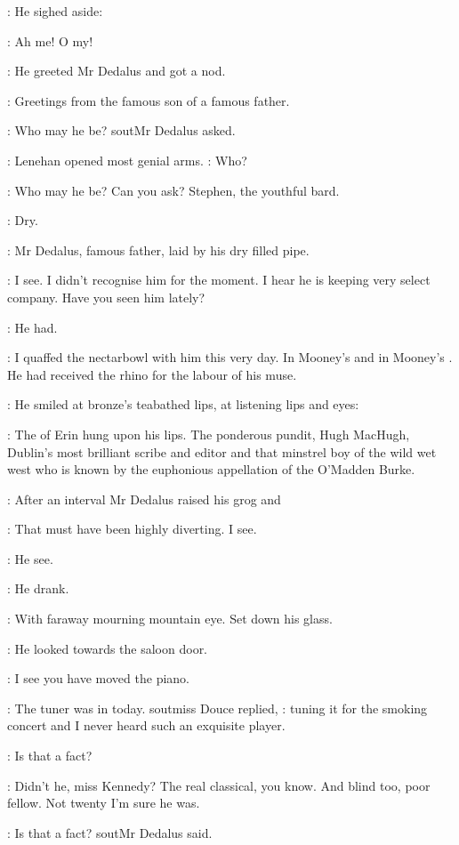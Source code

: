 :
He sighed aside:

\Lenehan:
Ah me! O my!

:
He greeted Mr Dedalus and got a nod.

\Lenehan:
Greetings from the famous son of a famous father.

\Simon:
Who may he be?
sout{Mr Dedalus asked.}

:
Lenehan opened most genial arms.
\Lenehan:
Who?

\Lenehan:
Who may he be? Can you ask? Stephen, the youthful bard.

:
Dry.

:
Mr Dedalus, famous father, laid by his dry filled pipe.

\Simon:
I see.
I didn't recognise him for the moment. I hear he is
keeping very select company. Have you seen him lately?

:
He had.

\Lenehan:
I quaffed the nectarbowl with him this very day. In
Mooney's  and in Mooney's .
He had received the rhino for the labour of his muse.

:
He smiled at bronze's teabathed lips, at listening lips and eyes:

\Lenehan:
The  of Erin hung upon his lips.
The ponderous pundit, Hugh
MacHugh, Dublin's most brilliant scribe and editor and that minstrel boy
of the wild wet west who is known by the euphonious appellation of the
O'Madden
Burke.

:
After an interval Mr Dedalus raised his grog and

\Simon:
That must have been highly diverting. I see.

:
He see.

:
He drank.

:
With faraway mourning mountain eye. Set down his glass.

:
He looked towards the saloon door.

\Simon:
I see you have moved the piano.

\MissD:
The tuner was in today.
sout{miss Douce replied,}
\MissD:
tuning it for the smoking
concert and I never heard such an exquisite player.

\Simon:
Is that a fact?

\MissD:
Didn't he, miss Kennedy?
The real classical, you know. And blind too,
poor fellow. Not twenty I'm sure he was.

\Simon:
Is that a fact?
sout{Mr Dedalus said.}

